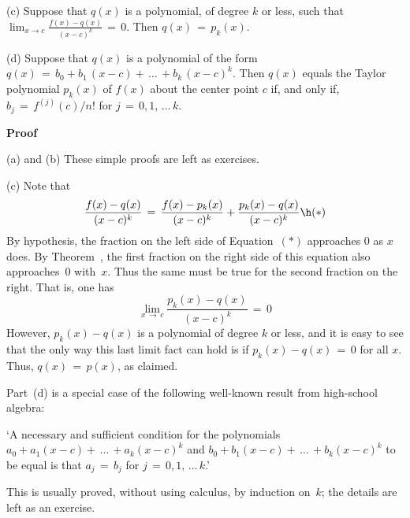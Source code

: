 {\V

        (c) Suppose that $q(x)$ is a polynomial, of degree $k$ or less, such that ${\displaystyle \lim_{x {\rightarrow} c} \frac{f(x)-q(x)}{(x-c)^{k}} \,=\, 0}$.
    Then $q(x) \,=\, p_{k}(x)$.

\V

        (d) Suppose that $q(x)$ is a polynomial of the form $q(x) \,=\, b_{0}+b_{1}\,(x-c)+ \,{\ldots}\, +b_{k}\,(x-c)^{k}$.
    Then $q(x)$ equals the Taylor polynomial $p_{k}(x)$ of $f(x)$ about the center point $c$
    if, and only if, $b_{j} \,=\, f^{(j)}(c)/n!$ for $j \,=\, 0,1, \,{\ldots}\, k$.

\V

        {\bf Proof}\,

\V

        (a) and (b) These simple proofs are left as exercises.
\V

        (c) Note that
        \begin{displaymath}
        \frac{f(x)-q(x)}{(x-c)^{k}} \,=\, \frac{f(x)-p_{k}(x)}{(x-c)^{k}} +
        \frac{p_{k}(x) - q(x)}{(x-c)^{k}} \h ({\ast})
        \end{displaymath}
    By hypothesis, the fraction on the left side of Equation~$({\ast})$ approaches $0$ as $x$ does.
    By Theorem~, the first fraction on the right side of this equation also approaches~$0$ with~$x$.
    Thus the same must be true for the second fraction on the right. That is, one has
        \begin{displaymath}
        \lim_{x \,{\rightarrow}\, c} \frac{p_{k}(x)-q(x)}{(x-c)^{k}} \,=\, 0
        \end{displaymath}
    However, $p_{k}(x)-q(x)$ is a polynomial of degree $k$ or less, and it is easy to see that the only way this last limit fact can hold is if $p_{k}(x)-q(x) \,=\, 0$ for all $x$.
    Thus, $q(x) \,=\, p(x)$, as claimed.

\V

        Part~(d) is a special case of the following well-known result from high-school algebra:

        `A necessary and sufficient condition for the polynomials $a_{0} + a_{1}(x-c) +  \,{\ldots}\,  + a_{k}(x-c)^{k}$ and $b_{0} + b_{1}(x-c)+ \,{\ldots}\, +b_{k}(x-c)^{k}$ to be equal is that $a_{j} \,=\, b_{j}$ for $j \,=\, 0,1, \,{\ldots}\, k$.'

\noindent This is usually proved, without using calculus, by induction on~$k$; the details are left as an exercise.

}
